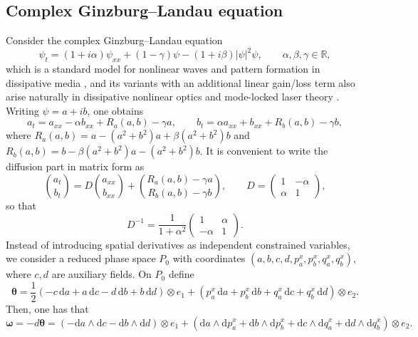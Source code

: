 \documentclass[11pt,a4paper]{article}
\newcommand{\dd}{\mathrm{d}}
\theoremstyle{plain} \newtheorem{theorem}{Theorem}[section] \newtheorem{proposition}[theorem]{Proposition} \newtheorem{corollary}[theorem]{Corollary} \newtheorem{lemma}[theorem]{Lemma} \theoremstyle{definition} \newtheorem{definition}[theorem]{Definition} \theoremstyle{remark} \newtheorem{remark}[theorem]{Remark} \newtheorem{example}[theorem]{Example} %
\begin{document}
\subsection{Complex Ginzburg--Landau equation} \label{subsec:CGL} Consider the complex Ginzburg--Landau equation \begin{equation}\label{eq:CGL} \psi_t=(1+i\alpha)\psi_{xx}+(1-\gamma)\psi-(1+i\beta)|\psi|^2\psi,\qquad \alpha,\beta,\gamma\in\mathbb R, \end{equation} which is a standard model for nonlinear waves and pattern formation in dissipative media \cite{KuramotoTsuzuki1976,AransonKramer2002,CrossHohenberg1993}, and its variants with an additional linear gain/loss term also arise naturally in dissipative nonlinear optics and mode-locked laser theory \cite{AkhmedievSotoCrespoTown2001,KomarovLeblondSanchez2005}. Writing \(\psi=a+ib\), one obtains \[ a_t=a_{xx}-\alpha b_{xx}+R_a(a,b)-\gamma a,\qquad b_t=\alpha a_{xx}+b_{xx}+R_b(a,b)-\gamma b, \] where \(R_a(a,b)=a-(a^2+b^2)a+\beta(a^2+b^2)b\) and \(R_b(a,b)=b-\beta(a^2+b^2)a-(a^2+b^2)b\). It is convenient to write the diffusion part in matrix form as \[ \binom{a_t}{b_t} = D\binom{a_{xx}}{b_{xx}}+\binom{R_a(a,b)-\gamma a}{R_b(a,b)-\gamma b}, \qquad D= \begin{pmatrix} 1&-\alpha\\ \alpha&1 \end{pmatrix}, \] so that \[ D^{-1}=\frac{1}{1+\alpha^2} \begin{pmatrix} 1&\alpha\\ -\alpha&1 \end{pmatrix}. \] Instead of introducing spatial derivatives as independent constrained variables, we consider a reduced phase space \(P_0\) with coordinates \((a,b,c,d,p_a^x,p_b^x,q_a^x,q_b^x)\), where \(c,d\) are auxiliary fields. On \(P_0\) define \[ \bm \theta=\frac12(-c\,\dd a+a\,\dd c-d\,\dd b+b\,\dd d)\otimes e_1+(p_a^x\,\dd a+p_b^x\,\dd b+q_a^x\,\dd c+q_b^x\,\dd d)\otimes e_2. \] Then, one has that
\[\bm\omega=-d\bm\theta=(-\dd a\wedge \dd c-\dd b\wedge \dd d)\otimes e_1+(\dd a\wedge \dd p_a^x+\dd b\wedge \dd p_b^x+\dd c\wedge \dd q_a^x+\dd d\wedge \dd q_b^x)\otimes e_2.
\]
\end{document}
